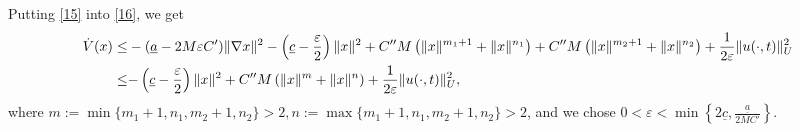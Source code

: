 \documentclass[onecolumn]{autart}
\newenvironment{proof of Prop.ODE}{{\it Proof of Proposition~\ref{Prop.ODE}:\enspace}}{\hfill $\blacksquare$\par}
\newenvironment{proof of PDE}{{\it Proof of Proposition \ref{Prop.8}:\enspace}}{\hfill $\blacksquare$\par}
\begin{document}
{\begin{proof of PDE}
	Putting \eqref{15} into \eqref{16}, we get
	\begin{align*}
		{\dot{V}(x)}
		\leq &-{(\underline{a} -2M\varepsilon C')}\|\nabla x\|^2  - \left (\underline{c}  - \frac{\varepsilon}{2} \right)\|x\|^2 + C ''M \left(\|x\|^{ m_{1}+1 } +\|x\|^{{n_1}}\right)
		+ C ''M \left(\|x\|^{ m_{2}+1} +\|x\|^{{n_2}}\right) +\frac{1}{2\varepsilon}   \|u(\cdot,t)\|^2_U \notag\\
		\leq &   {- \left (\underline{c}  - \frac{\varepsilon}{2} \right)\|x\|^2 +C''M \left(\|x\|^{m} +\|x\|^{n} \right) +\frac{1}{2\varepsilon}   \|u(\cdot,t)\|^2_U},
	\end{align*}
	where  {$m:= \min\{ m_{1}+1,n_1,m_{2}+1,n_2\}>2,
		n:= \max\{ m_{1}+1,n_1,m_{2}+1,n_2\}>2$,} and we {chose} $ 0<\varepsilon<\min\left\{2\underline{c},{\frac{\underline{a}}{2MC'}}\right\}$.

\end{proof of PDE}}
\end{document}
